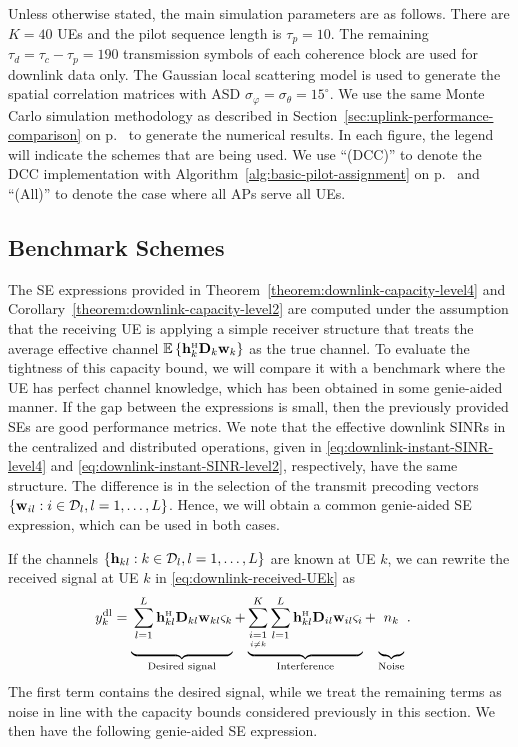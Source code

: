 Unless otherwise stated, the main simulation parameters are as follows. There are $K=40$ UEs 
 and the pilot sequence length is $\tau_p=10$. The remaining $\tau_d=\tau_c-\tau_p=190$ transmission symbols of each coherence block are used for downlink data only. The Gaussian local scattering model is used to generate the spatial correlation matrices with ASD $\sigma_{\varphi}=\sigma_{\theta}=15^{\circ}$. 
We use the same Monte Carlo simulation methodology as described in Section~\ref{sec:uplink-performance-comparison} on p.~\pageref{sec:uplink-performance-comparison} to generate the numerical results. In each figure, the legend will indicate the schemes that are being used.  We use ``(DCC)'' to denote the DCC implementation with Algorithm~\ref{alg:basic-pilot-assignment} on p.~\pageref{alg:basic-pilot-assignment}  and ``(All)'' to denote the case where all APs serve all UEs.

\subsection{Benchmark Schemes}
\label{sec:genie-aided-downlink}

The SE expressions provided in Theorem~\ref{theorem:downlink-capacity-level4} and Corollary~\ref{theorem:downlink-capacity-level2} are computed under the assumption that the receiving UE is applying a simple receiver structure that treats the average effective channel $\mathbb{E}\left \{ \vect{h}_{k}^{\Htran}\vect{D}_{k}{\vect{w}}_{k}\right \}$ as the true channel. To evaluate the tightness of this capacity bound, we will compare it with a benchmark where the UE has perfect channel knowledge, which has been obtained in some genie-aided manner. If the gap between the expressions is small, then the previously provided SEs are good performance metrics. We note that the effective downlink SINRs in the centralized and distributed operations, given in \eqref{eq:downlink-instant-SINR-level4} and \eqref{eq:downlink-instant-SINR-level2}, respectively, have the same structure. The difference is in the selection of the transmit precoding vectors $\{{\mathbf{w}}_{il}:i\in \mathcal{D}_l,l=1,\ldots,L\}$. Hence, we will obtain a common genie-aided SE expression, which can be used in both cases.

If the channels $\{\mathbf{h}_{kl}:k\in \mathcal{D}_l,l=1,\ldots,L\}$ are known at UE $k$, we can rewrite the received signal at UE $k$ in \eqref{eq:downlink-received-UEk} as
\begin{align} 
y_k^{\rm{dl}}& =\underbrace{ \vphantom{\condSum{i=1}{i \neq k}{K}} \sum_{l=1}^{L}  \vect{h}_{kl}^{\Htran} \vect{D}_{kl}  {\vect{w}}_{kl} \varsigma_k}_{\textrm{Desired signal}} + \underbrace{\condSum{i=1}{i \neq k}{K}  \sum_{l=1}^{L} \vect{h}_{kl}^{\Htran}\vect{D}_{il}  {\vect{w}}_{il} \varsigma_i}_{\textrm{Interference}} +\underbrace{ \vphantom{\condSum{i=1}{i \neq k}{K}} n_k}_{\textrm{Noise}} .\label{eq:DCC-downlink-2-genie-aided}
\end{align}
The first term contains the desired signal, while we treat the remaining terms as noise in line with the capacity bounds considered previously in this section. We then have the following genie-aided SE expression.

